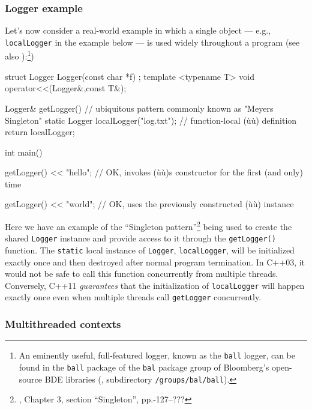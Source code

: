 \subsubsection[Logger example]{Logger example}\label{logger-example}

Let's now consider a 
real-world example in which a single object --- e.g.,
\lstinline!localLogger! in the example below --- is used widely throughout a program (see
also ):{\cprotect\footnote{An
eminently useful, full-featured logger, known as the \texttt{ball} logger, can be found in the
\texttt{ball} package of the \texttt{bal} package group of Bloomberg's open-source
  BDE libraries (\cite{bde14}, subdirectory \texttt{/groups/bal/ball}).}})

\begin{emcppshiddenlisting}[emcppsbatch=e3]
struct Logger {
  Logger(const char *f) {}
};
template <typename T>
void operator<<(Logger&,const T&);
\end{emcppshiddenlisting}
\begin{emcppslisting}[emcppsbatch=e3]
Logger& getLogger()  // ubiquitous pattern commonly known as "Meyers Singleton"
{
    static Logger localLogger("log.txt");  // function-local (ù{}ù) definition
    return localLogger;
}

int main()
{
    getLogger() << "hello";
        // OK, invokes (ù{}ù)s constructor for the first (and only) time

    getLogger() << "world";
        // OK, uses the previously constructed (ù{}ù) instance
}
\end{emcppslisting}

Here we have an example of the ``Singleton pattern''\footnote{\cite{gamma95}, Chapter 3, section
``Singleton'', pp.-127--???} being used to create the shared \lstinline!Logger! instance
and provide access to it through the \lstinline!getLogger()! function.  The \lstinline!static! local
instance of \lstinline!Logger!, \lstinline!localLogger!, will be initialized exactly once and then
destroyed after normal program termination.  In C++03, it would not be safe to call
this function concurrently from multiple threads. 
Conversely, C++11 \emph{guarantees} that the initialization  
of \lstinline!localLogger! will happen exactly once even when multiple threads call
\lstinline!getLogger! concurrently.

\subsubsection[Multithreaded contexts]{Multithreaded contexts}\label{multithreaded-contexts}

